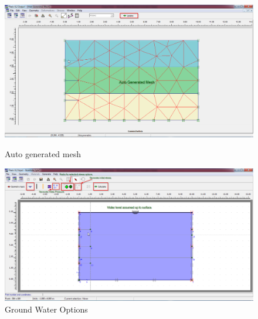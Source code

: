 \begin{figure}[hbtp]
  \centering
  \vfill
  \includegraphics[width=\linewidth, height=0.4\textheight,keepaspectratio]{images/plx/a (5).png}
  \caption{Auto generated mesh}
  \vfill
  \includegraphics[width=\linewidth, height=0.4\textheight,keepaspectratio]{images/plx/a (8).png}
  \caption{Ground Water Options}
  \vfill
\end{figure}
\break
